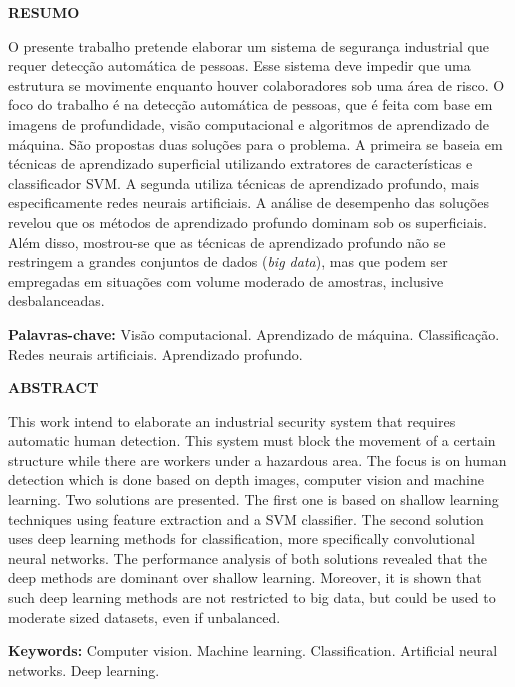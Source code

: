 \thispagestyle{plain}

\medskip

\begin{center}
  \textbf{RESUMO}
\end{center}



\bigskip

O presente trabalho pretende elaborar um sistema de segurança industrial que requer detecção automática de pessoas. Esse sistema deve impedir que uma estrutura se movimente enquanto houver colaboradores sob uma área de risco. O foco do trabalho é na detecção automática de pessoas, que é feita com base em imagens de profundidade, visão computacional e algoritmos de aprendizado de máquina. São propostas duas soluções para o problema. A primeira se baseia em técnicas de aprendizado superficial utilizando extratores de características e classificador SVM. A segunda utiliza técnicas de aprendizado profundo, mais especificamente redes neurais artificiais. A análise de desempenho das soluções revelou que os métodos de aprendizado profundo dominam sob os superficiais. Além disso, mostrou-se que as técnicas de aprendizado profundo não se restringem a grandes conjuntos de dados (\textit{big data}), mas que podem ser empregadas em situações com volume moderado de amostras, inclusive desbalanceadas.

\textbf{Palavras-chave:} Visão computacional. Aprendizado de máquina. Classificação. Redes neurais artificiais. Aprendizado profundo.

\cleardoublepageempty

\thispagestyle{plain}

\begin{center}
	\textbf{ABSTRACT}
\end{center}

\bigskip

This work intend to elaborate an industrial security system that requires automatic human detection. This system must block the movement of a certain structure while there are workers under a hazardous area. The focus is on human detection which is done based on depth images, computer vision and machine learning. Two solutions are presented. The first one is based on shallow learning techniques using feature extraction and a SVM classifier. The second solution uses deep learning methods for classification, more specifically convolutional neural networks. The performance analysis of both solutions revealed that the deep methods are dominant over shallow learning. Moreover, it is shown that such deep learning methods are not restricted to big data, but could be used to moderate sized datasets, even if unbalanced.

\textbf{Keywords:} Computer vision. Machine learning. Classification. Artificial neural networks. Deep learning.
